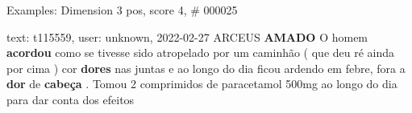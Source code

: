 \begin{frame}{Examples: Dimension 3 pos, score 4, \# 000025}
\footnotesize
\begin{exampleblock}{text: t115559, user: unknown, 2022-02-27}
ARCEUS \textbf{AMADO} O homem \textbf{acordou} como se tivesse sido atropelado 
por um caminhão ( que deu ré ainda por cima ) cor \textbf{dores} nas juntas e 
ao longo do dia ficou ardendo em febre, fora a \textbf{dor} de \textbf{cabeça} 
. Tomou 2 comprimidos de paracetamol 500mg ao longo do dia para dar conta dos 
efeitos 
\end{exampleblock}
\end{frame}
